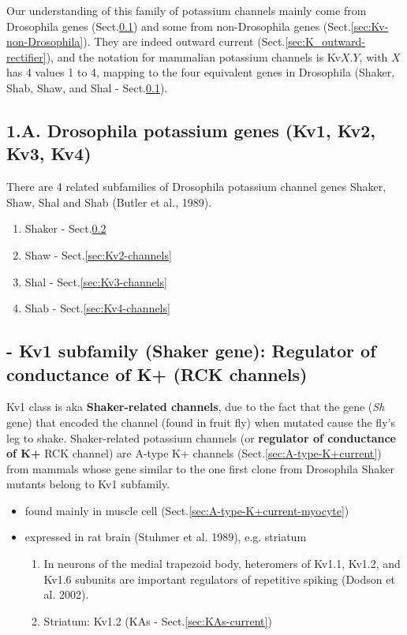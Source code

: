 Our understanding of this family of potassium channels mainly come from
Drosophila genes (Sect.\ref{sec:Kv-Drosophila}) and some from non-Drosophila
genes (Sect.\ref{sec:Kv-non-Drosophila}). They are indeed outward current
(Sect.\ref{sec:K_outward-rectifier}), and the notation for mammalian potassium
channels is Kv$X.Y$, with $X$ has 4 values 1 to 4, mapping to the four
equivalent genes in Drosophila (Shaker, Shab, Shaw, and Shal -
Sect.\ref{sec:Kv-Drosophila}).


\subsection{1.A. Drosophila potassium genes (Kv1, Kv2, Kv3, Kv4)}
\label{sec:Kv-Drosophila}

There are 4 related subfamilies of Drosophila potassium channel genes Shaker,
Shaw, Shal and Shab (Butler et al., 1989).
\begin{enumerate}
  \item Shaker - Sect.\ref{sec:Kv1-channels}
  \item Shaw - Sect.\ref{sec:Kv2-channels}
  \item Shal - Sect.\ref{sec:Kv3-channels}
  \item Shab - Sect.\ref{sec:Kv4-channels}
\end{enumerate}


\subsection{- Kv1 subfamily (Shaker gene): Regulator of conductance of K+ (RCK
channels)}
\label{sec:Kv1-channels}
\label{sec:Shaker-gene}

Kv1 class is aka {\bf Shaker-related channels}, due to the fact that the  gene
({\it Sh} gene) that encoded the channel (found in fruit fly) when mutated cause
the fly's leg to shake.  Shaker-related potassium channels (or {\bf regulator of
conductance of K+} RCK channel) are A-type K+ channels
(Sect.\ref{sec:A-type-K+current}) from mammals whose gene similar to the one
first clone from Drosophila Shaker mutants belong to Kv1 subfamily.

\begin{itemize}
  \item found mainly in muscle cell (Sect.\ref{sec:A-type-K+current-myocyte})
  
  \item expressed in rat brain (Stuhmer et al. 1989), e.g. striatum

\begin{enumerate}
  
  \item In neurons of the medial trapezoid body, heteromers of Kv1.1, Kv1.2, and
  Kv1.6 subunits are important regulators of repetitive spiking (Dodson et al.
  2002).
  
  \item Striatum: Kv1.2 (KAs - Sect.\ref{sec:KAs-current}) 
\end{enumerate}
\end{itemize}


